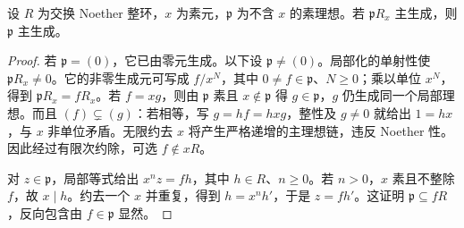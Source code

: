 \begin{lemma}\label{b3:lem:prime-generator-descends}
	设 \(R\) 为交换 Noether 整环，\(x\) 为素元，\(\mathfrak p\) 为不含 \(x\) 的素理想。若 \(\mathfrak pR_x\) 主生成，则 \(\mathfrak p\) 主生成。
\end{lemma}
\begin{proof}
	若 \(\mathfrak p=(0)\)，它已由零元生成。以下设 \(\mathfrak p\ne(0)\)。局部化的单射性使 \(\mathfrak pR_x\ne0\)。它的非零生成元可写成 \(f/x^N\)，其中 \(0\ne f\in\mathfrak p\)、\(N\ge0\)；乘以单位 \(x^N\)，得到 \(\mathfrak pR_x=fR_x\)。若 \(f=xg\)，则由 \(\mathfrak p\) 素且 \(x\notin\mathfrak p\) 得 \(g\in\mathfrak p\)，\(g\) 仍生成同一个局部理想。而且 \((f)\subsetneq(g)\)：若相等，写 \(g=hf=hxg\)，整性及 \(g\ne0\) 就给出 \(1=hx\)，与 \(x\) 非单位矛盾。无限约去 \(x\) 将产生严格递增的主理想链，违反 Noether 性。因此经过有限次约除，可选 \(f\notin xR\)。

	对 \(z\in\mathfrak p\)，局部等式给出 \(x^nz=fh\)，其中 \(h\in R\)、\(n\ge0\)。若 \(n>0\)，\(x\) 素且不整除 \(f\)，故 \(x\mid h\)。约去一个 \(x\) 并重复，得到 \(h=x^nh'\)，于是 \(z=fh'\)。这证明 \(\mathfrak p\subseteq fR\)，反向包含由 \(f\in\mathfrak p\) 显然。
\end{proof}

